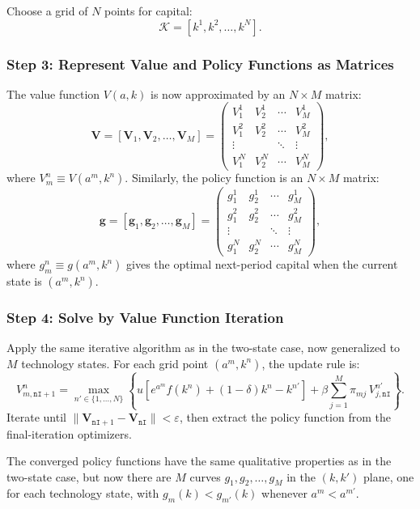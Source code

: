 Choose a grid of $N$ points for capital:
$$
\mathcal{K} = [k^1, k^2, \ldots, k^N].
$$

\subsubsection*{Step 3: Represent Value and Policy Functions as Matrices}

The value function $V(a, k)$ is now approximated by an $N \times M$ matrix:
$$
\mathbf{V} = [\mathbf{V}_1, \mathbf{V}_2, \ldots, \mathbf{V}_M] = \begin{pmatrix} V_1^1 & V_2^1 & \cdots & V_M^1 \\ V_1^2 & V_2^2 & \cdots & V_M^2 \\ \vdots & & \ddots & \vdots \\ V_1^N & V_2^N & \cdots & V_M^N \end{pmatrix},
$$
where $V_m^n \equiv V(a^m, k^n)$. Similarly, the policy function is an $N \times M$ matrix:
$$
\mathbf{g} = [\mathbf{g}_1, \mathbf{g}_2, \ldots, \mathbf{g}_M] = \begin{pmatrix} g_1^1 & g_2^1 & \cdots & g_M^1 \\ g_1^2 & g_2^2 & \cdots & g_M^2 \\ \vdots & & \ddots & \vdots \\ g_1^N & g_2^N & \cdots & g_M^N \end{pmatrix},
$$
where $g_m^n \equiv g(a^m, k^n)$ gives the optimal next-period capital when the current state is $(a^m, k^n)$.

\subsubsection*{Step 4: Solve by Value Function Iteration}

Apply the same iterative algorithm as in the two-state case, now generalized to $M$ technology states. For each grid point $(a^m, k^n)$, the update rule is:
$$
V_{m, \texttt{nI}+1}^n = \max_{n' \in \{1, \ldots, N\}} \left\{ u\!\left[e^{a^m} f(k^n) + (1-\delta)k^n - k^{n'}\right] + \beta \sum_{j=1}^{M} \pi_{mj}\, V_{j, \texttt{nI}}^{n'} \right\}.
$$
Iterate until $\|\mathbf{V}_{\texttt{nI}+1} - \mathbf{V}_{\texttt{nI}}\| < \varepsilon$, then extract the policy function from the final-iteration optimizers.

The converged policy functions have the same qualitative properties as in the two-state case, but now there are $M$ curves $g_1, g_2, \ldots, g_M$ in the $(k, k')$ plane, one for each technology state, with $g_m(k) < g_{m'}(k)$ whenever $a^m < a^{m'}$.

